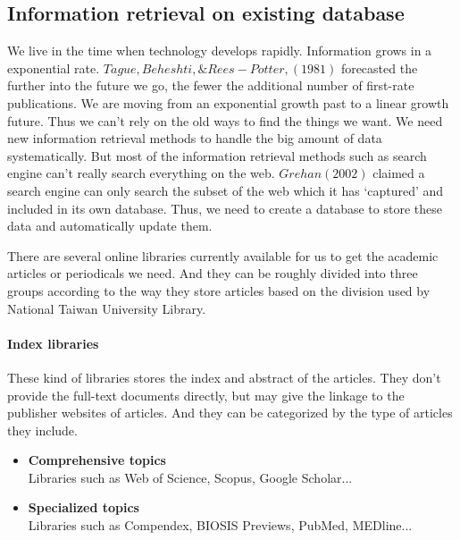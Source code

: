 	
\subsection{Information retrieval on existing database}


We live in the time when technology develops rapidly. Information grows in a exponential rate. $Tague, Beheshti, \& Rees-Potter, (1981)$ forecasted the further into the future we go, the fewer the additional number of first-rate publications. We are moving from an exponential growth past to a linear growth future. Thus we can't rely on the old ways to find the things we want. 
We need new information retrieval methods to handle the big amount of data systematically.
But most of the information retrieval methods such as search engine can't really search everything on the web. 
$Grehan (2002)$ claimed a search engine can only search the subset of the web which it has ‘captured’ and included in its own database. Thus, we need to create a database to store these data and automatically update them.

There are several online libraries currently available for us to get the academic articles or periodicals we need.
And they can be roughly divided into three groups according to the way they store articles based on the division used by National Taiwan University Library.

\paragraph{Index libraries}

	These kind of libraries stores the index and abstract of the articles.
	They don't provide the full-text documents directly, but may give the linkage to the publisher websites of articles.
	And they can be categorized by the type of articles they include.
	
	\begin{itemize}
		
		\item\textbf{Comprehensive topics}\\Libraries such as Web of Science, Scopus, Google Scholar...
		\item\textbf{Specialized topics}\\Libraries such as Compendex, BIOSIS Previews, PubMed, MEDline...
		
	\end{itemize}
	
